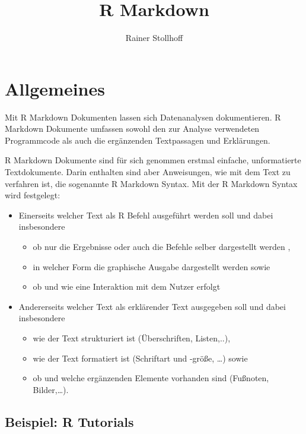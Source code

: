 \documentclass[
]{article}
\title{R Markdown}
\author{Rainer Stollhoff}
\date{}
\providecommand{\tightlist}{%
  \setlength{\itemsep}{0pt}\setlength{\parskip}{0pt}}
\begin{document}
\maketitle

{
\setcounter{tocdepth}{2}
\tableofcontents
}
\hypertarget{allgemeines}{%
\section{Allgemeines}\label{allgemeines}}

Mit R Markdown Dokumenten lassen sich Datenanalysen dokumentieren. R
Markdown Dokumente umfassen sowohl den zur Analyse verwendeten
Programmcode als auch die ergänzenden Textpassagen und Erklärungen.

R Markdown Dokumente sind für sich genommen erstmal einfache,
unformatierte Textdokumente. Darin enthalten sind aber Anweisungen, wie
mit dem Text zu verfahren ist, die sogenannte R Markdown Syntax. Mit der
R Markdown Syntax wird festgelegt:

\begin{itemize}
\tightlist
\item
  Einerseits welcher Text als R Befehl ausgeführt werden soll und dabei
  insbesondere

  \begin{itemize}
  \tightlist
  \item
    ob nur die Ergebnisse oder auch die Befehle selber dargestellt
    werden ,
  \item
    in welcher Form die graphische Ausgabe dargestellt werden sowie
  \item
    ob und wie eine Interaktion mit dem Nutzer erfolgt
  \end{itemize}
\item
  Andererseits welcher Text als erklärender Text ausgegeben soll und
  dabei insbesondere

  \begin{itemize}
  \tightlist
  \item
    wie der Text strukturiert ist (Überschriften, Listen,..),
  \item
    wie der Text formatiert ist (Schriftart und -größe, \ldots) sowie
  \item
    ob und welche ergänzenden Elemente vorhanden sind (Fußnoten,
    Bilder,\ldots).
  \end{itemize}
\end{itemize}

\hypertarget{beispiel-r-tutorials}{%
\subsection{Beispiel: R Tutorials}\label{beispiel-r-tutorials}}
\end{document}
